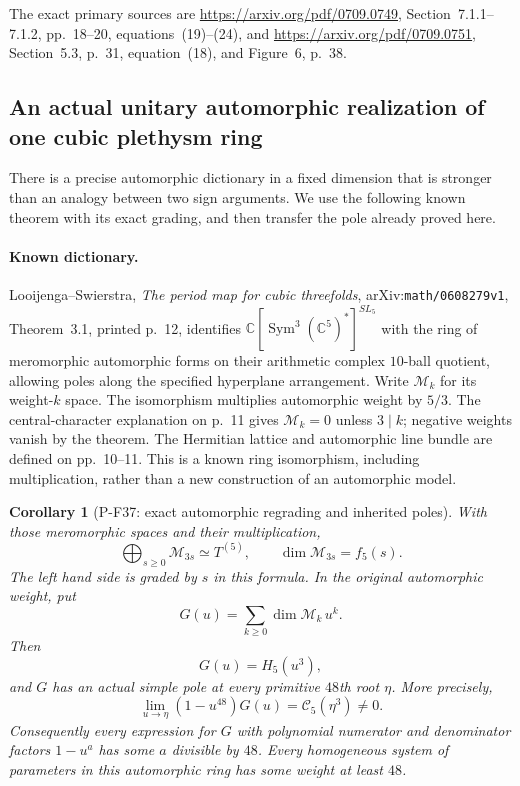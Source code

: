 \documentclass[11pt,a4paper]{article}
\newtheorem{corollary}[proposition]{Corollary}
\begin{document}
The exact primary sources are
\url{https://arxiv.org/pdf/0709.0749}, Section~7.1.1--7.1.2,
pp.~18--20, equations~(19)--(24), and
\url{https://arxiv.org/pdf/0709.0751}, Section~5.3, p.~31,
equation~(18), and Figure~6, p.~38.


\subsection{An actual unitary automorphic realization of one cubic plethysm ring}

There is a precise automorphic dictionary in a fixed dimension that is
stronger than an analogy between two sign arguments. We use the following
known theorem with its exact grading, and then transfer the pole already
proved here.

\paragraph{Known dictionary.}
Looijenga--Swierstra, \emph{The period map for cubic threefolds},
arXiv:\texttt{math/0608279v1}, Theorem~3.1, printed p.~12, identifies
$\mathbb C[\operatorname{Sym}^3(\mathbb C^5)^*]^{SL_5}$ with the
ring of meromorphic automorphic forms on their arithmetic complex
$10$-ball quotient, allowing poles along the specified hyperplane
arrangement. Write $\mathcal M_k$ for its weight-$k$ space.
The isomorphism multiplies automorphic weight by $5/3$.
The central-character explanation on p.~11 gives
$\mathcal M_k=0$ unless $3\mid k$; negative weights vanish
by the theorem. The Hermitian lattice and automorphic line
bundle are defined on pp.~10--11. This is a known ring
isomorphism, including multiplication, rather than a
new construction of an automorphic model.

\begin{corollary}[P-F37: exact automorphic regrading and inherited poles]
\label{cor:automorphiccubic}
With those meromorphic spaces and their multiplication,
\[
 \bigoplus_{s\ge0}\mathcal M_{3s}\simeq T^{(5)},\qquad
 \dim\mathcal M_{3s}=f_5(s).
 \tag{P-F37a}
\]
The left hand side is graded by $s$ in this formula.
In the original automorphic weight, put
\[
 G(u)=\sum_{k\ge0}\dim\mathcal M_k\,u^k.
\]
Then
\[
                         G(u)=H_5(u^3),
 \tag{P-F37b}
\]
and $G$ has an actual simple pole at every primitive
$48$th root $\eta$. More precisely,
\[
 \lim_{u\to\eta}(1-u^{48})G(u)
                          =\mathcal C_5(\eta^3)\ne0.
 \tag{P-F37c}
\]
Consequently every expression for $G$ with polynomial numerator
and denominator factors $1-u^a$ has some $a$ divisible by $48$.
Every homogeneous system of parameters in this automorphic
ring has some weight at least $48$.
\end{corollary}
\end{document}
